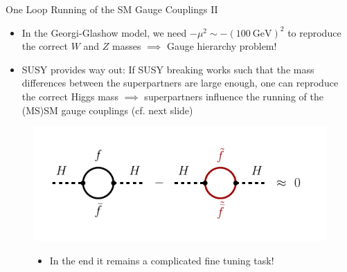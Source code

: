 \begin{frame}{One Loop Running of the SM Gauge Couplings II}
	\begin{itemize}
			\item In the Georgi-Glashow model, we need $-\mu^2 \sim -(100\ \mathrm{GeV})^2$ to reproduce the correct $W$ and $Z$ masses $\implies$ \alert{Gauge hierarchy problem!} \cite{PeskinSchroeder1995}\\[1em]
		\item SUSY provides way out: If SUSY breaking works such that the mass differences between the superpartners are large enough, one can reproduce the correct Higgs mass $\implies$ superpartners influence the running of the (MS)SM gauge couplings (cf. next slide)
	\end{itemize}
\begin{figure}
	\centering
	\includegraphics{figures/running_diagrams.pdf}
	\begin{itemize}
		\item In the end it remains a complicated \alert{fine tuning} task!
	\end{itemize}

	\end{figure}	

\end{frame}


